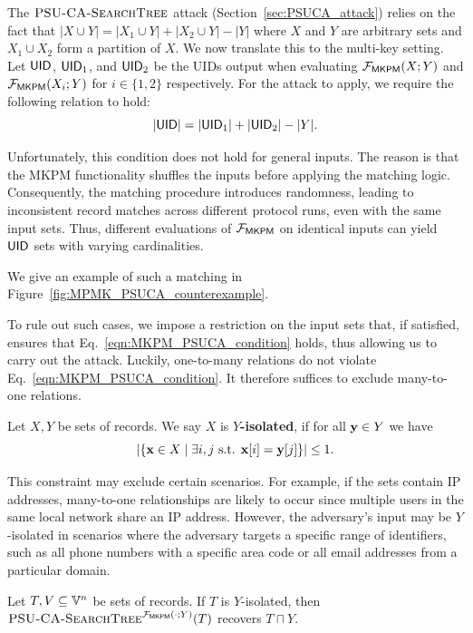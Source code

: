 The $\textsc{PSU\mbox{-}CA\mbox{-}SearchTree}{}$ attack (Section~\ref{sec:PSUCA_attack}) relies
on the fact that $|X \cup Y| = |X_1 \cup Y| + |X_2 \cup Y| - |Y|$
where $X$ and $Y$ are arbitrary
sets and $X_1\cup X_2$ form a partition of $X$. We now translate this to the
multi-key setting. Let $\mathsf{UID}$, $\mathsf{UID}_1$, and $\mathsf{UID}_2$ be the UIDs output when
evaluating $\mathcal{F}_{\mathsf{MKPM}}(X; Y)$ and $\mathcal{F}_{\mathsf{MKPM}}(X_i; Y)$ for
$i \in \{1, 2\}$ respectively. For the attack to apply, we require the following
relation to hold:
\begin{equation}
  \label{eqn:MKPM_PSUCA_condition}
  |\mathsf{UID}| = |\mathsf{UID}_1| + |\mathsf{UID}_2| - |Y|.
\end{equation}

Unfortunately, this condition does not hold for general inputs. The reason is
that the MKPM functionality shuffles the inputs before applying the matching
logic. Consequently, the matching procedure introduces randomness, leading to
inconsistent record matches across different protocol runs, even with the same
input sets. Thus, different evaluations of $\mathcal{F}_{\mathsf{MKPM}}$ on identical inputs can
yield $\mathsf{UID}$ sets with varying cardinalities.

We give an example of such a matching in
Figure~\ref{fig:MPMK_PSUCA_counterexample}.

To rule out such cases, we impose a restriction on the input sets that, if
satisfied, ensures that Eq.~\ref{eqn:MKPM_PSUCA_condition} holds, thus allowing
us to carry out the attack. Luckily, one-to-many relations do not violate
Eq.~\ref{eqn:MKPM_PSUCA_condition}. It therefore suffices to exclude many-to-one
relations.

\begin{definition}\label{def:isolated_set}
  Let $X, Y$ be sets of records.
  We say $X$ is \textbf{$Y$-isolated}, 
  if for all $\mathbf{y}\in Y$ we have 
  $$|\{\mathbf{x} \in X \; | \; \exists i, j \text{ s.t. } \mathbf{x}[i] = \mathbf{y}[j]\}|
  \leq 1.$$
\end{definition}

This constraint may exclude certain scenarios. For example, if the sets contain
IP addresses, many-to-one relationships are likely to occur since multiple users
in the same local network share an IP address. However, the adversary's input
may be $Y$-isolated in scenarios where the adversary targets a specific range of
identifiers, such as all phone numbers with a specific area code or all email
addresses from a particular domain.

\begin{theorem}\label{thm:psu-mkpm:correctness}
  Let $T,V\subseteq \Ispace{}^n$ be sets of records. If $T$ is $Y$-isolated,
  then $\textsc{PSU\mbox{-}CA\mbox{-}SearchTree}^{\mathcal{F}_{\mathsf{MKPM}}(\cdot; Y)}(T)$ recovers $T \sqcap Y$.
\end{theorem}

